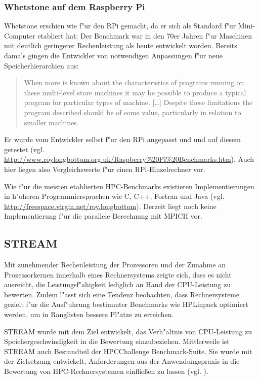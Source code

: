 \subsubsection{Whetstone auf dem Raspberry Pi}\label{Whetstone-RPi}

Whetstone erschien wie f"ur den RPi gemacht, da er sich als Standard f"ur Mini-Computer etabliert hat: Der Benchmark war in den 70er Jahren f"ur Maschinen mit deutlich geringerer Rechenleistung als heute entwickelt worden. Bereits damals gingen die Entwickler von notwendigen Anpassungen f"ur neue Speicherhierarchien aus: 
\begin{quote}
\onehalfspacing
When more is known about the characteristics of programs running on these multi-level store machines it may be possible to produce a typical program for particular types of machine. [\dots] Despite these limitations the program described should be of some value, particularly in relation to smaller machines. \cite{cur76}
\end{quote}
Er wurde vom Entwickler selbst f"ur den RPi angepasst und und auf diesem getestet (vgl. \url{http://www.roylongbottom.org.uk/Raspberry\%20Pi\%20Benchmarks.htm}). Auch hier liegen also Vergleichswerte f"ur einen RPi-Einzelrechner vor. 

Wie f"ur die meisten etablierten HPC-Benchmarks existieren Implementierungen in h"oheren Programmiersprachen wie C, C++, Fortran und Java (vgl. \url{http://freespace.virgin.net/roy.longbottom}). Derzeit liegt noch keine Implementierung f"ur die parallele Berechnung mit MPICH vor. 

\subsection{STREAM}\label{STREAM}

Mit zunehmender Rechenleistung der Prozessoren und der Zunahme an Prozessorkernen innerhalb eines Rechnersystems zeigte sich, dass es nicht ausreicht, die Leistungsf"ahigkeit lediglich an Hand der CPU-Leistung zu bewerten. Zudem l"asst sich eine Tendenz beobachten, dass Rechnersysteme gezielt f"ur die Ausf"uhrung bestimmter Benchmarks wie HPLinpack optimiert werden, um in Ranglisten bessere Pl"atze zu erreichen. 

STREAM wurde mit dem Ziel entwickelt, das Verh"altnis von CPU-Leistung zu Speichergeschwindigkeit in die Bewertung einzubeziehen. Mittlerweile ist STREAM auch Bestandteil der HPCChallenge Benchmark-Suite. Sie wurde mit der Zielsetzung entwickelt, Anforderungen aus der Anwendungspraxis in die Bewertung von HPC-Rechnersystemen einflie\ss en zu lassen (vgl. \cite{lus05}).

